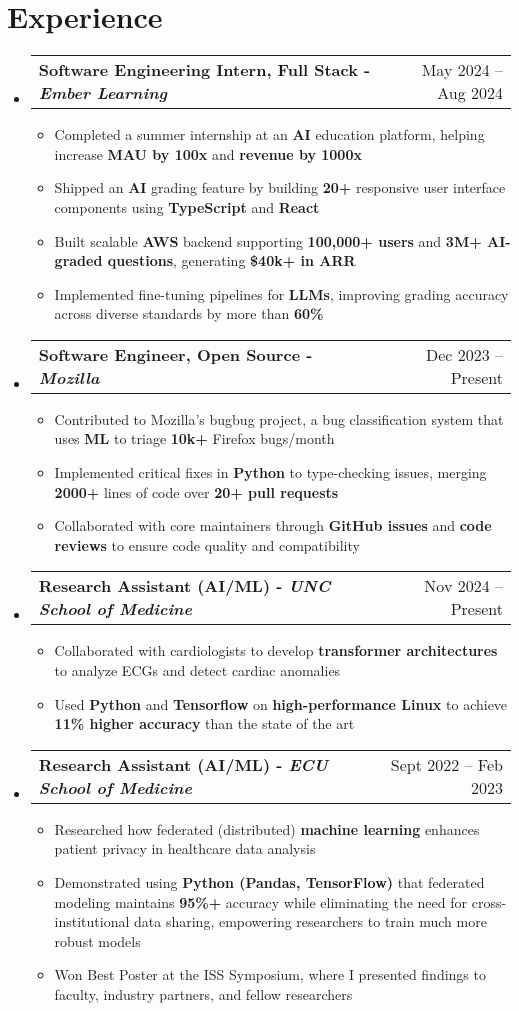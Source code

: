 \documentclass[letterpaper,11pt]{article}
\makeatletter
\newcommand{\resumeItem}[1]{
  \item\small{
    {#1 \vspace{-2pt}}}
}
\newcommand{\resumeSubheading}[2]{
  \vspace{-2pt}\item
    \begin{tabular*}{0.97\textwidth}[t]{l@{\extracolsep{\fill}}r}
      \textbf{#1} & #2 \\
    \end{tabular*}
    \vspace{-7pt}
}
\newcommand{\resumeSubHeadingListStart}{\begin{itemize}[leftmargin=0.15in, label={}]}
\newcommand{\resumeSubHeadingListEnd}{\end{itemize}}
\newcommand{\resumeItemListStart}{\begin{itemize}[leftmargin=0.15in]}
\newcommand{\resumeItemListEnd}{\end{itemize}\vspace{-5pt}}
\makeatother
\begin{document}
\section{Experience}
  \resumeSubHeadingListStart
    \resumeSubheading
      {\textbf{Software Engineering Intern, Full Stack} - \textit{Ember Learning}}{May 2024 -- Aug 2024}
      \resumeItemListStart
        \resumeItem{Completed a summer internship at an \textbf{AI} education platform, helping increase \textbf{MAU by 100x} and \textbf{revenue by 1000x}}
        \resumeItem{Shipped an \textbf{AI} grading feature by building \textbf{20+} responsive user interface components using \textbf{TypeScript} and \textbf{React}}
        \resumeItem{Built scalable \textbf{AWS} backend supporting \textbf{100,000+ users} and \textbf{3M+ AI-graded questions}, generating \textbf{\$40k+ in ARR}}
        \resumeItem{Implemented fine-tuning pipelines for \textbf{LLMs}, improving grading accuracy across diverse standards by more than \textbf{60\%}}
      \resumeItemListEnd
      \resumeSubheading
      {\textbf{Software Engineer, Open Source} - \textit{Mozilla}}{Dec 2023 -- Present}
      \resumeItemListStart
        \resumeItem{Contributed to Mozilla's bugbug project, a bug classification system that uses \textbf{ML} to triage \textbf{10k+} Firefox bugs/month} 
        \resumeItem{Implemented critical fixes in \textbf{Python} to type-checking issues, merging \textbf{2000+} lines of code over \textbf{20+ pull requests}}
        \resumeItem{Collaborated with core maintainers through \textbf{GitHub issues} and \textbf{code reviews} to ensure code quality and compatibility}
      \resumeItemListEnd
      \resumeSubheading
      {\textbf{Research Assistant (AI/ML)} - \textit{UNC School of Medicine}}{ Nov 2024 -- Present}
      \resumeItemListStart
        \resumeItem{Collaborated with cardiologists to develop \textbf{transformer architectures} to analyze ECGs and detect cardiac anomalies}
        \resumeItem{Used \textbf{Python} and \textbf{Tensorflow} on \textbf{high-performance Linux} to achieve \textbf{11\% higher accuracy} than the state of the art}
      \resumeItemListEnd
      \resumeSubheading
      {\textbf{Research Assistant (AI/ML)} - \textit{ECU School of Medicine}}{Sept 2022 -- Feb 2023}
      \resumeItemListStart
        \resumeItem{Researched how federated (distributed) \textbf{machine learning} enhances patient privacy in healthcare data analysis}
        \resumeItem{Demonstrated using \textbf{Python (Pandas, TensorFlow)} that federated modeling maintains \textbf{95\%+} accuracy while eliminating the need for cross-institutional data sharing, empowering researchers to train much more robust models}
        \resumeItem{Won Best Poster at the ISS Symposium, where I presented findings to faculty, industry partners, and fellow researchers}
      \resumeItemListEnd
  \resumeSubHeadingListEnd
\end{document}
